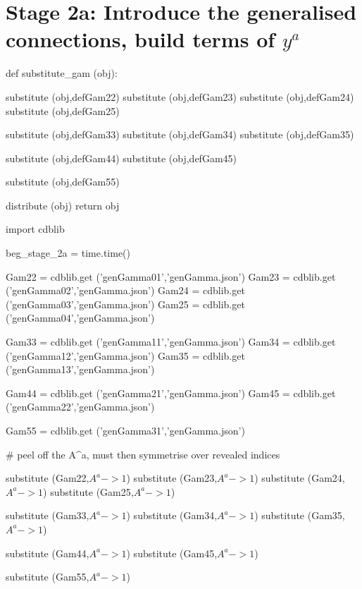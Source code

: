\documentclass[12pt]{cdblatex}
\begin{document}
\clearpage

\section*{Stage 2a: Introduce the generalised connections, build terms of $y^{a}$}

\begin{cadabra}
   def substitute_gam (obj):

       substitute     (obj,defGam22)
       substitute     (obj,defGam23)
       substitute     (obj,defGam24)
       substitute     (obj,defGam25)

       substitute     (obj,defGam33)
       substitute     (obj,defGam34)
       substitute     (obj,defGam35)

       substitute     (obj,defGam44)
       substitute     (obj,defGam45)

       substitute     (obj,defGam55)

       distribute     (obj)
       return obj

   import cdblib

   beg_stage_2a = time.time()

   Gam22 = cdblib.get ('genGamma01','genGamma.json')
   Gam23 = cdblib.get ('genGamma02','genGamma.json')
   Gam24 = cdblib.get ('genGamma03','genGamma.json')
   Gam25 = cdblib.get ('genGamma04','genGamma.json')

   Gam33 = cdblib.get ('genGamma11','genGamma.json')
   Gam34 = cdblib.get ('genGamma12','genGamma.json')
   Gam35 = cdblib.get ('genGamma13','genGamma.json')

   Gam44 = cdblib.get ('genGamma21','genGamma.json')
   Gam45 = cdblib.get ('genGamma22','genGamma.json')

   Gam55 = cdblib.get ('genGamma31','genGamma.json')

   # peel off the A^{a}, must then symmetrise over revealed indices

   substitute (Gam22,$A^{a}->1$)
   substitute (Gam23,$A^{a}->1$)
   substitute (Gam24,$A^{a}->1$)
   substitute (Gam25,$A^{a}->1$)

   substitute (Gam33,$A^{a}->1$)
   substitute (Gam34,$A^{a}->1$)
   substitute (Gam35,$A^{a}->1$)

   substitute (Gam44,$A^{a}->1$)
   substitute (Gam45,$A^{a}->1$)

   substitute (Gam55,$A^{a}->1$)


\end{cadabra}
\end{document}
